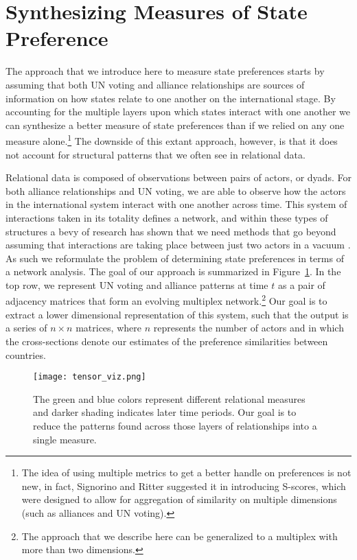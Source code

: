 \section*{Synthesizing Measures of State Preference}

The approach that we introduce here to measure state preferences starts by assuming that both UN voting and alliance relationships are sources of information on how states relate to one another on the international stage. By accounting for the multiple layers upon which states interact with one another we can synthesize a better measure of state preferences than if we relied on any one measure alone.\footnote{The idea of using multiple metrics to get a better handle on preferences is not new, in fact, Signorino and Ritter suggested it in introducing S-scores, which were designed to allow for aggregation of similarity on multiple dimensions (such as alliances and UN voting).} The downside of this extant approach, however, is that it does not account for structural patterns that we often see in relational data. 

Relational data is composed of observations between pairs of actors, or dyads. For both alliance relationships and UN voting, we are able to observe how the actors in the international system interact with one another across time. This system of interactions taken in its totality defines a network, and within these types of structures a bevy of research has shown that we need methods that go beyond assuming that interactions are taking place between just two actors in a vacuum \citep{wasserman:faust:1994,snijders:nowicki:1997,minhas:etal:2019}. As such we reformulate the problem of determining state preferences in terms of a network analysis. The goal of our approach is summarized in Figure~\ref{fig:tensViz}. In the top row, we represent UN voting and alliance patterns at time $t$ as a pair of adjacency matrices that form an evolving multiplex network.\footnote{The approach that we describe here can be generalized to a multiplex with more than two dimensions.} Our goal is to extract a lower dimensional representation of this system, such that the output is a series of $n \times n$ matrices, where $n$ represents the number of actors and in which the cross-sections denote our estimates of the preference similarities between countries.

\begin{figure}[ht]
	\centering
	\texttt{[image: tensor\_viz.png]}
	\caption{The green and blue colors represent different relational measures and darker shading indicates later time periods. Our goal is to reduce the patterns found across those layers of relationships into a single measure.}
	\label{fig:tensViz}
\end{figure}

